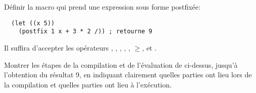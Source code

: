 \begin{Exercise}[title={Macro postfix}]
\label{ex:macro_postfix}
  Définir la macro  qui prend une expression sous forme
postfixée:

\begin{verbatim}
  (let ((x 5))
    (postfix 1 x + 3 * 2 /)) ; retourne 9
\end{verbatim}

\noindent
Il suffira d'accepter les opérateurs \codeinline{+}, \codeinline{-}, \codeinline{*}, \codeinline{/},
, $\geq$, et .

Montrer les étapes de la compilation et de l'évaluation de
 ci-dessus, jusqu'à l'obtention du résultat 9, en indiquant
clairement quelles parties ont lieu lors de la compilation et quelles parties
ont lieu à l'exécution.
\end{Exercise}

\begin{Answer}[ref={ex:macro_postfix}]
\end{Answer}